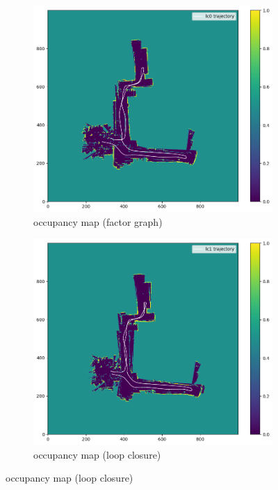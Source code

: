 \documentclass[conference]{IEEEtran}
\begin{document}
\begin{figure}
\begin{subfigure}{0.24\textwidth}
        \label{fig:omap_20_icp}
    \end{subfigure}
    \hfill
    \begin{subfigure}{0.24\textwidth}
        \includegraphics[width=\linewidth]{../img/omap_20_lc0.png}
        \caption{occupancy map (factor graph)}
        \label{fig:omap_20_lc0}
    \end{subfigure}
    \hfill
    \begin{subfigure}{0.24\textwidth}
        \includegraphics[width=\linewidth]{../img/omap_20_lc1.png}
        \caption{occupancy map (loop closure)}
        \label{fig:omap_20_lc1}
    \end{subfigure}
    

\end{figure}
\end{document}
